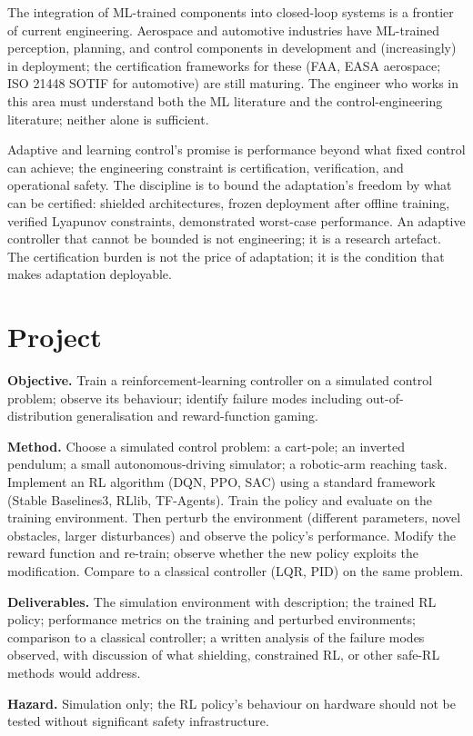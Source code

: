 The integration of ML-trained components into closed-loop systems is a frontier of current engineering. Aerospace and automotive industries have ML-trained perception, planning, and control components in development and (increasingly) in deployment; the certification frameworks for these (FAA, EASA aerospace; ISO 21448 SOTIF for automotive) are still maturing. The engineer who works in this area must understand both the ML literature and the control-engineering literature; neither alone is sufficient.

\begin{principle}
Adaptive and learning control's promise is performance beyond what fixed control can achieve; the engineering constraint is certification, verification, and operational safety. The discipline is to bound the adaptation's freedom by what can be certified: shielded architectures, frozen deployment after offline training, verified Lyapunov constraints, demonstrated worst-case performance. An adaptive controller that cannot be bounded is not engineering; it is a research artefact. The certification burden is not the price of adaptation; it is the condition that makes adaptation deployable.
\end{principle}

\section{Project}

\begin{project}
\textbf{Objective.} Train a reinforcement-learning controller on a simulated control problem; observe its behaviour; identify failure modes including out-of-distribution generalisation and reward-function gaming.

\textbf{Method.} Choose a simulated control problem: a cart-pole; an inverted pendulum; a small autonomous-driving simulator; a robotic-arm reaching task. Implement an RL algorithm (DQN, PPO, SAC) using a standard framework (Stable Baselines3, RLlib, TF-Agents). Train the policy and evaluate on the training environment. Then perturb the environment (different parameters, novel obstacles, larger disturbances) and observe the policy's performance. Modify the reward function and re-train; observe whether the new policy exploits the modification. Compare to a classical controller (LQR, PID) on the same problem.

\textbf{Deliverables.} The simulation environment with description; the trained RL policy; performance metrics on the training and perturbed environments; comparison to a classical controller; a written analysis of the failure modes observed, with discussion of what shielding, constrained RL, or other safe-RL methods would address.

\textbf{Hazard.} Simulation only; the RL policy's behaviour on hardware should not be tested without significant safety infrastructure.
\end{project}

